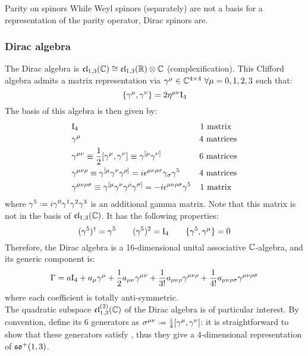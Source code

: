 \begin{example}{Parity on spinors}{}
  While Weyl spinors (separately) are not a basis for a representation of the parity operator, Dirac spinors are.
\end{example}

\subsubsection{Dirac algebra}

The Dirac algebra is $ \mathfrak{cl}_{1,3}(\mathbb{C}) \cong \mathfrak{cl}_{1,3}(\mathbb{R}) \otimes \mathbb{C} $ (complexification). This Clifford algebra admits a matrix representation via $ \gamma^\mu \in \mathbb{C}^{4 \times 4} \,\,\forall \mu = 0,1,2,3 $ such that:
\begin{equation}
  \{\gamma^\mu , \gamma^\nu\} = 2 \eta^{\mu \nu} \mathrm{I}_4
\end{equation}
The basis of this algebra is then given by:
\begin{align*}
  & \mathrm{I}_4 & \text{1 matrix}\,\,\,\, \\
  & \gamma^\mu & \text{4 matrices} \\
  & \gamma^{\mu \nu} \equiv \frac{1}{2} [\gamma^\mu, \gamma^\nu] \equiv \gamma^{[\mu} \gamma^{\nu]} & \text{6 matrices} \\
  & \gamma^{\mu \nu \rho} \equiv \gamma^{[\mu} \gamma^\nu \gamma^{\rho]} = i \epsilon^{\mu \nu \rho \sigma} \gamma_\sigma \gamma^5 & \text{4 matrices} \\
  & \gamma^{\mu \nu \rho \sigma} \equiv \gamma^{[\mu} \gamma^\nu \gamma^\rho \gamma^{\sigma]} = - i \epsilon^{\mu \nu \rho \sigma} \gamma^5 & \text{1 matrix}\,\,\,\,
\end{align*}
where $ \gamma^5 \defeq i \gamma^0 \gamma^1 \gamma^2 \gamma^3 $ is an additional gamma matrix. Note that this matrix is not in the basis of $ \mathfrak{cl}_{1,3}(\mathbb{C}) $. It has the following properties:
\begin{equation*}
  (\gamma^5)^\dagger = \gamma^5
  \qquad
  (\gamma^5)^2 = \mathrm{I}_4
  \qquad
  \{\gamma^5 , \gamma^\mu\} = 0
\end{equation*}
Therefore, the Dirac algebra is a 16-dimensional unital associative $ \mathbb{C} $-algebra, and its generic component is:
\begin{equation}
  \Gamma = a \mathrm{I}_4 + a_\mu \gamma^\mu + \frac{1}{2} a_{\mu \nu} \gamma^{\mu \nu} + \frac{1}{3!} a_{\mu \nu \rho} \gamma^{\mu \nu \rho} + \frac{1}{4!} a_{\mu \nu \rho \sigma} \gamma^{\mu \nu \rho \sigma}
\end{equation}
where each coefficient is totally anti-symmetric.\\
The quadratic subspace $ \mathfrak{cl}_{1,3}^{(2)}(\mathbb{C}) $ of the Dirac algebra is of particular interest. By convention, define its 6 generators as $ \sigma^{\mu \nu} \defeq \frac{i}{4} [\gamma^\mu , \gamma^\nu] $: it is straightforward to show that these generators satisfy , thus they give a 4-dimensional representation of $ \mathfrak{so}^+(1,3) $.

